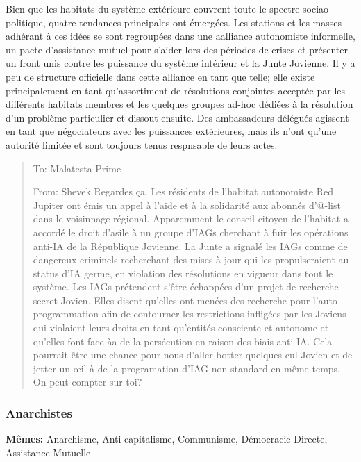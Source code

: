                               Bien que les habitats du système extérieure couvrent toute le spectre sociao-politique, quatre tendances principales ont émergées. Les stations et les masses adhérant à ces idées se sont regroupées dans une aalliance autonomiste informelle, un pacte d'assistance mutuel pour s'aider lors des périodes de crises et présenter un front unis contre les puissance du système intérieur et la Junte Jovienne. Il y a peu de structure officielle dans cette alliance en tant que telle; elle existe principalement en tant qu'assortiment de résolutions conjointes acceptée par les différents habitats membres et les quelques groupes ad-hoc dédiées à la résolution d'un problème particulier et dissout ensuite. Des ambassadeurs délégués agissent en tant que négociateurs avec les puissances extérieures, mais ils n'ont qu'une autorité limitée et sont toujours tenus respnsable de leurs actes. 

                              \begin{quotation} To: Malatesta Prime 

                                 From: Shevek Regardes ça. Les résidents de l'habitat autonomiste Red Jupiter ont émis un appel à l'aide et à la solidarité aux abonnés d'@-list dans le voisinnage régional. Apparemment le conseil citoyen de l'habitat a accordé le droit d'asile à un groupe d'IAGs cherchant à fuir les opérations anti-IA de la République Jovienne. La Junte a signalé les IAGs comme de dangereux criminels recherchant des mises à jour qui les propulseraient au status d'IA germe, en violation des résolutions en vigueur dans tout le système. Les IAGs prétendent s'être échappées d'un projet de recherche secret Jovien. Elles disent qu'elles ont menées des recherche pour l'auto-programmation afin de contourner les restrictions infligées par les Joviens qui violaient leurs droits en tant qu'entités consciente et autonome et qu'elles font face àa de la persécution en raison des biais anti-IA. Cela pourrait être une chance pour nous d'aller botter quelques cul Jovien et de jetter un œil à de la programation d'IAG non standard en même temps. On peut compter sur toi? \end{quotation} 

                                 \subsubsection{Anarchistes} \label{sec:anarchists} 

                                 \textbf{Mêmes:} Anarchisme, Anti-capitalisme, Communisme, Démocracie Directe, Assistance Mutuelle 

